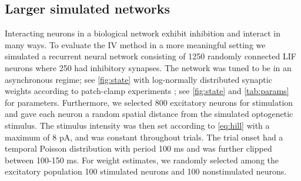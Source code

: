 \documentclass[11pt]{article}
\begin{document}
\FloatBarrier

\subsection{Larger simulated networks}
Interacting neurons in a biological network exhibit inhibition and interact in many ways. 
To evaluate the IV method in a more meaningful setting we simulated a recurrent neural network consisting of 1250 randomly connected LIF neurons where 250 had inhibitory synapses. 
The network was tuned to be in an asynchronous regime; see \cref{fig:state} with log-normally distributed synaptic weights according to patch-clamp experiments \citep{Sayer1990,Mason1991}; see \cref{fig:state} and \cref{tab:params} for parameters. 
Furthermore, we selected 800 excitatory neurons for stimulation and gave each neuron a random spatial distance from the simulated optogenetic stimulus. 
The stimulus intensity was then set according to \cref{eq:hill} with a maximum of 8 pA, and was constant throughout trials. 
The trial onset had a temporal Poisson distribution with period 100 ms and was further clipped between 100-150 ms. 
For weight estimates, we randomly selected among the excitatory population 100 stimulated neurons and 100 nonstimulated neurons. 
\end{document}
